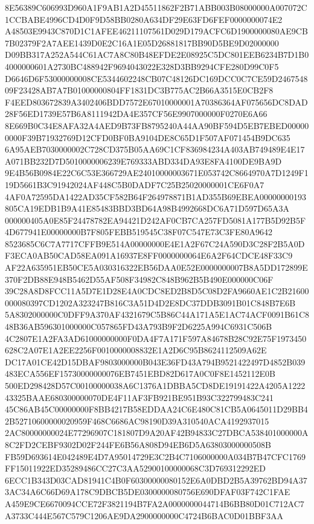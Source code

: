 \documentclass[UTF8,fontset=fandol,zihao=-4,a4paper]{ctexart}
\begin{document}
{{8E56389C606993D960A1F9AB1A2D45511862F2B71ABB003B08000000A007072C1CCBABE4996CD4D0F9D58BB0280A634DF29E63FD6FEF0000000074E2
A48503E9943C870D1C1AFEE46211107561D029D179ACFC6D1900000080AE9CB7B02379F2A7AEE1439D0E2C16A1E05D26881817BB90D5BE9D02000000
D09BB317A252A544C61AC7A8C80B48EFDE2E08925C5DC801EEB6234B7D1B04000000601A2730BC488942F9694043022E328D3BB9294CFE280D99C0F5
D6646D6F53000000008CE5344602248CB07C48126DC169DCC0C7CE59D246754809F23428AB7A7B01000000804FF1831DC3B775AC2B66A3515E0CB2F8
F4EED803672839A3402406BDD7572E67010000001A70386364AF075656DC8DAD28F56ED1739E57B6A8111942DA4E357CF56E9907000000F0270E6A66
8E669B0C34E8AFA32A4AED9B73FB8795240A44AA90BF594D5EB7EBED000000000F39B71932769D12CFD0BF0BA9104DE8C65D1F507AF071454B9DC635
6A95AEB7030000002C728CD375B05AA69C1CF836984234A403AB749489E4E17A071BB232D7D5010000006239E769333ABD334DA93E8FA4100DE9BA9D
9E4B56B0984E22C6C53E366729AE24010000003671E053742C8664970A7D1249F119D5661B3C91942024AF448C5B0DADF7C25B25020000001CE6F0A7
4AF0A72595DA1422AD35CF582B64F264978871B1AD355B69EBEA00000000193805CA19EDB1B9A41E85483BBD3BD64A98B4992668DC6A71D597D65A3A
000000405A0E85F24478782EA94421D242AF0CB7CA257FD5081A177B5D92B5F4D677941E00000000B7F805FEBB519545C38F07C547E73C3FE80A9642
8523685C6C7A7717CFFB9E514A00000000E4E1A2F67C24A590D3C28F2B5A0DF3ECA0AB50CAD58EA091A16937E8FF0000000064E6A2F64CDCE48F33C9
AF22A635951EB50CE5A030316322EB56DAA0E52E0000000007B8A5DD172899E370F2DB88E948B5462D55AF508F34982C848B962B5B490E000000C06F
39C28A8D8FCC11A5D7E1D28E4A0CDC8ED2B8D5C08D2FA9660AE1C2B21600000080397CD1202A323247B816C3A51D4D2E8DC37DDB3091B01C848B7E6B
5A8302000000C0DFF9A370AF4321679C5B86C44A171A5E1AC74ACF0091B61C848B36AB596301000000C057865FD43A793B9F2D6225A994C6931C506B
4C2807E1A2FA3AD61000000000F0DA4F7A171F597A84678B28C92E75F1973450628C2A07E1A2EE2256F0010000008832E1A2D6C95B8624112509A62E
DC17A01CE42D15DBAF9803000000B043E36FD43A794B9521422497D4852B039483ECA556EF15730000000076EB7451EBD82D617A0C0F8E1452112E0B
500ED298428D57C00100000038A6C1376A1DBBA5CD8DE19191422A4205A122243325BAAE680300000070DE4F11AF3FB921BE951B93C322799483C241
45C86AB45C00000000F8BB4217B58EDDAA24C6E480C81CB5A0645011D29BB42B52710600000020959F468C6686AC98190D39A310540ACA4192937015
2AC80000000024E77296907C181807D9A20AF42B94833C27DBCA538401000000A8C2FD2CEBF9302D02F244FE6B56A808D94EB6D5A63803000000508B
FB59D693614E042489E4D7A95014729E3C2B4C7106000000A034B7B47CFC1769FF15011922ED35289486CC27C3AA52900100000068C3D769312292ED
6ECC1B343D03CAD81941C4B0F60300000080152E6A0DBD2B5A39762BD94A373AC34A6C66D69A178C9DBCB5DE0300000080756E690DFAF03F742C1FAE
A459E9CE6670094CCE72F3821194B7FA2A0000000044714B6BB80D01C712AC7A3733C444E567C579C1206AE9DA2900000000C4724B6BAC0D01BBF3AA
}}
\end{document}
